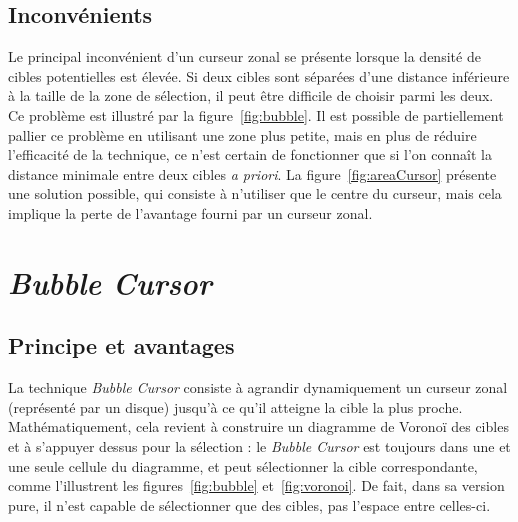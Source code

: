 	\subsection{Inconvénients}
	Le principal inconvénient d'un curseur zonal se présente lorsque la densité de cibles potentielles est élevée. Si deux cibles sont séparées d'une distance inférieure à la taille de la zone de sélection, il peut être difficile de choisir parmi les deux. Ce problème est illustré par la figure~\ref{fig:bubble}. Il est possible de partiellement pallier ce problème en utilisant une zone plus petite, mais en plus de réduire l'efficacité de la technique, ce n'est certain de fonctionner que si l'on connaît la distance minimale entre deux cibles \emph{a priori}. La figure~\ref{fig:areaCursor} présente une solution possible, qui consiste à n'utiliser que le centre du curseur, mais cela implique la perte de l'avantage fourni par un curseur zonal.

\section{\emph{Bubble Cursor}}
	\subsection{Principe et avantages}
	La technique \emph{Bubble Cursor} consiste à agrandir dynamiquement un curseur zonal (représenté par un disque) jusqu'à ce qu'il atteigne la cible la plus proche. Mathématiquement, cela revient à construire un diagramme de Voronoï des cibles et à s'appuyer dessus pour la sélection : le \emph{Bubble Cursor} est toujours dans une et une seule cellule du diagramme, et peut sélectionner la cible correspondante, comme l'illustrent les figures~\ref{fig:bubble} et~\ref{fig:voronoi}. De fait, dans sa version pure, il n'est capable de sélectionner que des cibles, pas l'espace entre celles-ci.	
		
